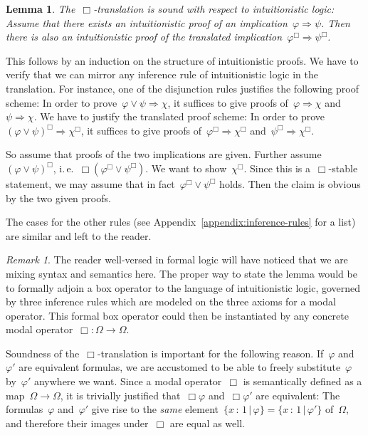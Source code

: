 \documentclass[10pt,reqno,a4paper]{amsbook}
\makeatletter
\theoremstyle{definition}
\theoremstyle{plain}
\newtheorem{lemma}[defn]{Lemma}
\theoremstyle{remark}
\newtheorem{rem}[defn]{Remark}
\newcommand{\?}{\,{:}\,}
\renewcommand{\_}{\mathpunct{.}\,}
\newcommand{\ie}{i.\,e.\@\xspace}
\renewenvironment{proof}[1][\proofname]{\par
  \pushQED{\qed}%
  \normalfont \topsep6\p@\@plus6\p@\relax
  \trivlist
  \item[\hskip\labelsep
        \itshape
    #1\@addpunct{.}]\ignorespaces
}{%
  \popQED\endtrivlist\@endpefalse
}
\makeatother
\begin{document}
\begin{lemma}\label{lemma:box-translation-sound}
The~$\Box$-translation is sound with respect to intuitionistic logic:
Assume that there exists an intuitionistic proof of an
implication~$\varphi \Rightarrow \psi$. Then there is also an intuitionistic
proof of the translated implication~$\varphi^\Box \Rightarrow \psi^\Box$.
\end{lemma}
\begin{proof}This follows by an induction on the structure of intuitionistic
proofs. We have to verify that we can mirror any inference rule of
intuitionistic logic in the translation. For instance, one of the disjunction
rules justifies the following proof scheme: In order to prove~$\varphi \vee
\psi \Rightarrow \chi$, it suffices to give proofs of~$\varphi \Rightarrow
\chi$ and~$\psi \Rightarrow \chi$. We have to justify the translated proof
scheme: In order to prove~$(\varphi \vee \psi)^\Box \Rightarrow \chi^\Box$, it
suffices to give proofs of~$\varphi^\Box \Rightarrow \chi^\Box$ and~$\psi^\Box
\Rightarrow \chi^\Box$.

So assume that proofs of the two implications are given. Further
assume~$(\varphi \vee \psi)^\Box$, \ie~$\Box(\varphi^\Box \vee \psi^\Box)$.
We want to show~$\chi^\Box$. Since this is a~$\Box$-stable statement, we may
assume that in fact~$\varphi^\Box \vee \psi^\Box$ holds. Then the claim is
obvious by the two given proofs.

The cases for the other rules (see Appendix~\ref{appendix:inference-rules} for
a list) are similar and left to the reader.\end{proof}

\begin{rem}The reader well-versed in formal logic will have noticed that we are
mixing syntax and semantics here. The proper way to state the lemma would be
to formally adjoin a box operator to the language of intuitionistic logic,
governed by three inference rules which are modeled on the three axioms for a
modal operator. This formal box operator could then be instantiated by any
concrete modal operator~$\Box : \Omega \to \Omega$.\end{rem}

Soundness of the~$\Box$-translation is important for the following reason.
If~$\varphi$ and~$\varphi'$ are equivalent formulas, we are
accustomed to be able to freely substitute~$\varphi$ by~$\varphi'$ anywhere we
want. Since a modal operator~$\Box$ is semantically defined as a map~$\Omega
\to \Omega$, it is trivially justified that~$\Box\varphi$ and~$\Box\varphi'$
are equivalent: The formulas~$\varphi$ and~$\varphi'$ give rise to the
\emph{same} element~$\{x \? 1 \,|\, \varphi\} = \{x \? 1 \,|\, \varphi'\}$
of~$\Omega$, and therefore their images under~$\Box$ are equal as well.
\end{document}
